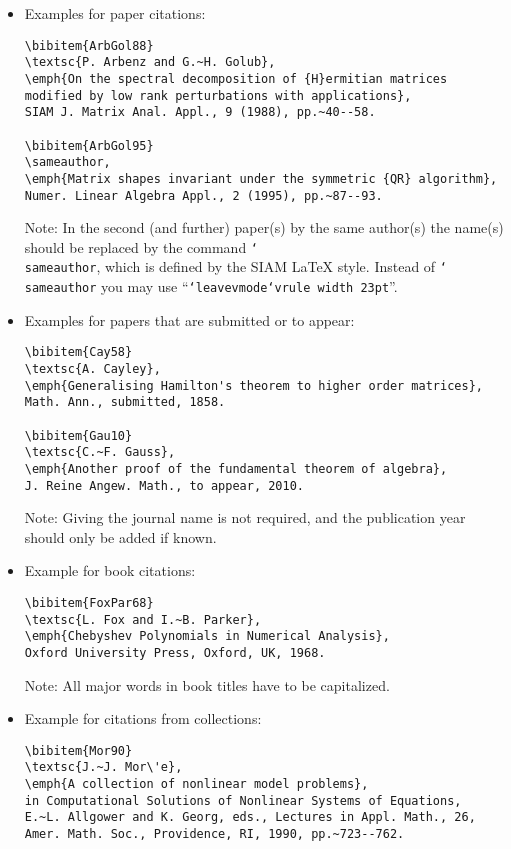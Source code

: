 \documentclass{scrartcl}
\begin{document}
\begin{itemize}
\item Examples for paper citations:

\begin{verbatim}
\bibitem{ArbGol88}
\textsc{P. Arbenz and G.~H. Golub},
\emph{On the spectral decomposition of {H}ermitian matrices
modified by low rank perturbations with applications},
SIAM J. Matrix Anal. Appl., 9 (1988), pp.~40--58.

\bibitem{ArbGol95}
\sameauthor,
\emph{Matrix shapes invariant under the symmetric {QR} algorithm},
Numer. Linear Algebra Appl., 2 (1995), pp.~87--93.
\end{verbatim}
%
Note: In the second (and further) paper(s) by the same author(s) the name(s)
should be replaced by the command \texttt{\char`\\sameauthor}, which is defined
by the SIAM LaTeX style. Instead of \texttt{\char`\\sameauthor} you may use
``\mbox{\texttt{\char`\\leavevmode\char`\\vrule height 2pt depth -1.6pt width
23pt}}''.

\item Examples for papers that are submitted or to appear:

\begin{verbatim}
\bibitem{Cay58}
\textsc{A. Cayley},
\emph{Generalising Hamilton's theorem to higher order matrices},
Math. Ann., submitted, 1858.

\bibitem{Gau10}
\textsc{C.~F. Gauss},
\emph{Another proof of the fundamental theorem of algebra},
J. Reine Angew. Math., to appear, 2010.
\end{verbatim}

Note: Giving the journal name is not required, and the publication year should
only be added if known.

\item Example for book citations:

\begin{verbatim}
\bibitem{FoxPar68}
\textsc{L. Fox and I.~B. Parker},
\emph{Chebyshev Polynomials in Numerical Analysis},
Oxford University Press, Oxford, UK, 1968.
\end{verbatim}

Note: All major words in book titles have to be capitalized.


\item Example for citations from collections:

\begin{verbatim}
\bibitem{Mor90}
\textsc{J.~J. Mor\'e},
\emph{A collection of nonlinear model problems},
in Computational Solutions of Nonlinear Systems of Equations,
E.~L. Allgower and K. Georg, eds., Lectures in Appl. Math., 26,
Amer. Math. Soc., Providence, RI, 1990, pp.~723--762.
\end{verbatim}

\end{itemize}
\end{document}

